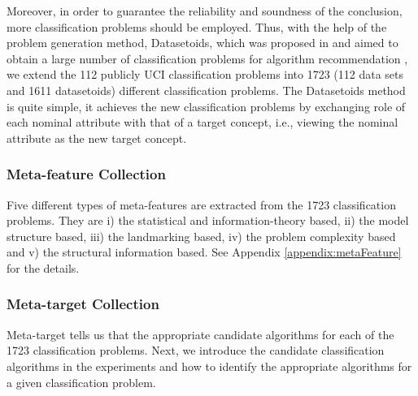 \documentclass[prodmode,acmtkdd]{acmsmall}
\begin{document}
Moreover, in order to guarantee the reliability and soundness of the
conclusion, more classification problems should be employed. Thus,
with the help of the problem generation method, Datasetoids, which
was proposed in \cite{soares2009uci} and aimed to obtain a large
number of classification problems for algorithm recommendation
\cite{prudencio2011selecting}, we extend the 112 publicly UCI
classification problems into 1723 (112 data sets and 1611
datasetoids) different classification problems. The Datasetoids
method is quite simple, it achieves the new classification problems
by exchanging role of each nominal attribute with that of a target
concept, i.e., viewing the nominal attribute as the new target
concept.

\subsubsection{Meta-feature Collection}

Five different types of meta-features are extracted from the 1723
classification problems. They are i) the statistical and
information-theory based, ii) the model structure based, iii) the
landmarking based, iv) the problem complexity based and v) the
structural information based. See Appendix \ref{appendix:metaFeature} for the details.

\subsubsection{Meta-target Collection}

Meta-target tells us that the appropriate candidate algorithms for
each of the 1723 classification problems. Next, we introduce the
candidate classification algorithms in the experiments and how to
identify the appropriate algorithms for a given classification
problem.
\end{document}
